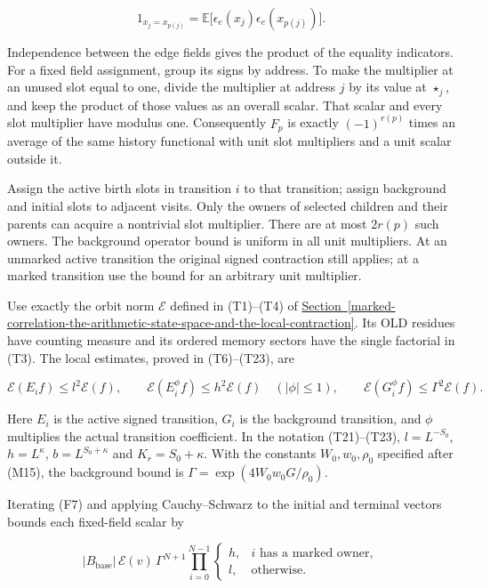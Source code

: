 \[
1_{x_j=x_{p(j)}}=
\mathbb E\bigl[\epsilon_e(x_j)\epsilon_e(x_{p(j)})\bigr].
\tag{F6}
\]

Independence between the edge fields gives the product of the equality
indicators. For a fixed field assignment, group its signs by address. To
make the multiplier at an unused slot equal to one, divide the
multiplier at address \(j\) by its value at \(\star_j\), and keep the
product of those values as an overall scalar. That scalar and every slot
multiplier have modulus one. Consequently \(F_p\) is exactly
\((-1)^{r(p)}\) times an average of the same history functional with
unit slot multipliers and a unit scalar outside it.

Assign the active birth slots in transition \(i\) to that transition;
assign background and initial slots to adjacent visits. Only the owners
of selected children and their parents can acquire a nontrivial slot
multiplier. There are at most \(2r(p)\) such owners. The background
operator bound is uniform in all unit multipliers. At an unmarked active
transition the original signed contraction still applies; at a marked
transition use the bound for an arbitrary unit multiplier.

Use exactly the orbit norm \(\mathcal E\) defined in (T1)--(T4) of
\protect\hyperlink{marked-correlation-the-arithmetic-state-space-and-the-local-contraction}{Section~\ref{marked-correlation-the-arithmetic-state-space-and-the-local-contraction}}.
Its OLD residues have counting measure and its ordered memory sectors
have the single factorial in (T3). The local estimates, proved in
(T6)--(T23), are

\[
\mathcal E(E_i f)\le l^2\mathcal E(f),\qquad
\mathcal E(E_i^{\phi}f)\le h^2\mathcal E(f)
\quad(|\phi|\le1),\qquad
\mathcal E(G_i^{\phi}f)\le\Gamma^2\mathcal E(f).
\tag{F7}
\]

Here \(E_i\) is the active signed transition, \(G_i\) is the background
transition, and \(\phi\) multiplies the actual transition coefficient.
In the notation (T21)--(T23), \(l=L^{-S_0}\), \(h=L^\kappa\),
\(b=L^{S_0+\kappa}\) and \(K_r=S_0+\kappa\). With the constants
\(W_0,w_0,\rho_0\) specified after (M15), the background bound is
\(\Gamma=\exp(4W_0w_0G/\rho_0)\).

Iterating (F7) and applying Cauchy--Schwarz to the initial and terminal
vectors bounds each fixed-field scalar by

\[
|B_{\mathrm{base}}|\,\mathcal E(v)\,
 \Gamma^{N+1}\prod_{i=0}^{N-1}
 \begin{cases}h,&i\text{ has a marked owner},\\l,&\text{otherwise}.
 \end{cases}
\]

